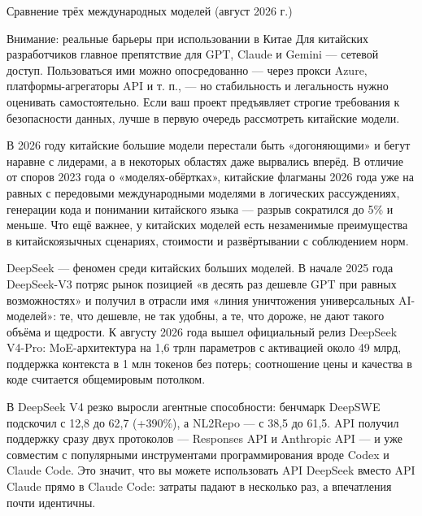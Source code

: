 \begin{center}\small\color{gray}Сравнение трёх международных моделей (август 2026 г.)\end{center}

\begin{tcbwarn}{Внимание: реальные барьеры при использовании в Китае}
Для китайских разработчиков главное препятствие для GPT, Claude и Gemini — сетевой доступ. Пользоваться ими можно опосредованно — через прокси Azure, платформы-агрегаторы API и т. п., — но стабильность и легальность нужно оценивать самостоятельно. Если ваш проект предъявляет строгие требования к безопасности данных, лучше в первую очередь рассмотреть китайские модели.

\end{tcbwarn}


В 2026 году китайские большие модели перестали быть «догоняющими» и бегут наравне с лидерами, а в некоторых областях даже вырвались вперёд. В отличие от споров 2023 года о «моделях-обёртках», китайские флагманы 2026 года уже на равных с передовыми международными моделями в логических рассуждениях, генерации кода и понимании китайского языка — разрыв сократился до 5\% и меньше. Что ещё важнее, у китайских моделей есть незаменимые преимущества в китайскоязычных сценариях, стоимости и развёртывании с соблюдением норм.


DeepSeek — феномен среди китайских больших моделей. В начале 2025 года DeepSeek-V3 потряс рынок позицией «в десять раз дешевле GPT при равных возможностях» и получил в отрасли имя «линия уничтожения универсальных AI-моделей»: те, что дешевле, не так удобны, а те, что дороже, не дают такого объёма и щедрости. К августу 2026 года вышел официальный релиз DeepSeek V4-Pro: MoE-архитектура на 1,6 трлн параметров с активацией около 49 млрд, поддержка контекста в 1 млн токенов без потерь; соотношение цены и качества в коде считается общемировым потолком.

В DeepSeek V4 резко выросли агентные способности: бенчмарк DeepSWE подскочил с 12,8 до 62,7 (+390\%), а NL2Repo — с 38,5 до 61,5. API получил поддержку сразу двух протоколов — Responses API и Anthropic API — и уже совместим с популярными инструментами программирования вроде Codex и Claude Code. Это значит, что вы можете использовать API DeepSeek вместо API Claude прямо в Claude Code: затраты падают в несколько раз, а впечатления почти идентичны.

